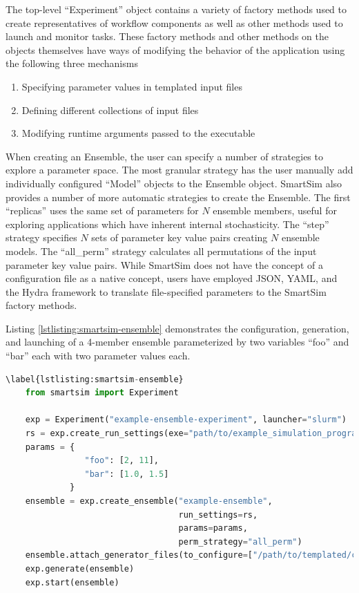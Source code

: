 \documentclass[utf8]{FrontiersinVancouver} %
\begin{document}
The top-level ``Experiment'' object contains a variety of factory methods used to create representatives of workflow components as well as other methods used to launch and monitor tasks. These factory methods and other methods on the objects themselves have ways of modifying the behavior of the application using the following three mechanisms
\begin{enumerate}
    \item Specifying parameter values in templated input files
    \item Defining different collections of input files
    \item Modifying runtime arguments passed to the executable
\end{enumerate}
When creating an Ensemble, the user can specify a number of strategies to explore a parameter space. The most granular strategy has the user manually add individually configured ``Model'' objects to the Ensemble object. SmartSim also provides a number of more automatic strategies to create the Ensemble. The first ``replicas'' uses the same set of parameters for $N$ ensemble members, useful for exploring applications which have inherent internal stochasticity. The ``step'' strategy specifies $N$ sets of parameter key value pairs creating $N$ ensemble models. The ``all\_perm'' strategy calculates all permutations of the input parameter key value pairs. While SmartSim does not have the concept of a configuration file as a native concept, users have employed JSON, YAML, and the Hydra framework \cite{Hadan2019Hydra} to translate file-specified parameters to the SmartSim factory methods.

Listing \ref{lstlisting:smartsim-ensemble} demonstrates the configuration, generation, and launching of a 4-member ensemble parameterized by two variables ``foo'' and ``bar'' each with two parameter values each. 
\begin{lstlisting}[language=python]\label{lstlisting:smartsim-ensemble}
    from smartsim import Experiment

    exp = Experiment("example-ensemble-experiment", launcher="slurm")
    rs = exp.create_run_settings(exe="path/to/example_simulation_program")
    params = {
                "foo": [2, 11],
                "bar": [1.0, 1.5]
             }
    ensemble = exp.create_ensemble("example-ensemble", 
                                   run_settings=rs, 
                                   params=params, 
                                   perm_strategy="all_perm")
    ensemble.attach_generator_files(to_configure=["/path/to/templated/config/file"])
    exp.generate(ensemble)
    exp.start(ensemble)
\end{lstlisting}
\end{document}
